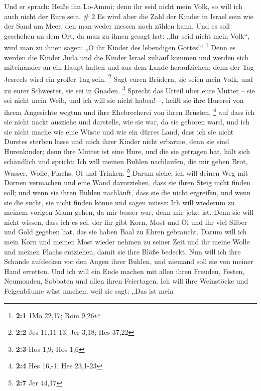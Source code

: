  Und er sprach: Heiße ihn Lo-Ammi; denn ihr seid nicht mein
Volk, so will ich auch nicht der Eure sein. \# 2  Es wird
aber die Zahl der Kinder in Israel sein wie der Sand am Meer, den man
weder messen noch zählen kann. Und es soll geschehen an dem Ort, da man
zu ihnen gesagt hat: „Ihr seid nicht mein Volk``, wird man zu ihnen
sagen: „O ihr Kinder des lebendigen Gottes!{}`` \footnote{\textbf{2:1}
  1Mo 22,17; Röm 9,26}  Denn es werden die Kinder Juda und
die Kinder Israel zuhauf kommen und werden sich miteinander an ein Haupt
halten und aus dem Lande heraufziehen; denn der Tag Jesreels wird ein
großer Tag sein. \footnote{\textbf{2:2} Jes 11,11-13; Jer 3,18; Hes
  37,22}  Sagt euren Brüdern, sie seien mein Volk, und zu
eurer Schwester, sie sei in Gnaden. \footnote{\textbf{2:3} Hos 1,9; Hos
  1,6}  Sprecht das Urteil über eure Mutter -- sie sei nicht
mein Weib, und ich will sie nicht haben! --, heißt sie ihre Hurerei von
ihrem Angesichte wegtun und ihre Ehebrecherei von ihren Brüsten,
\footnote{\textbf{2:4} Hes 16,-1; Hes 23,1-23}  auf dass ich
sie nicht nackt ausziehe und darstelle, wie sie war, da sie geboren
ward, und ich sie nicht mache wie eine Wüste und wie ein dürres Land,
dass ich sie nicht Durstes sterben lasse  und mich ihrer
Kinder nicht erbarme, denn sie sind Hurenkinder;  denn ihre
Mutter ist eine Hure, und die sie getragen hat, hält sich schändlich und
spricht: Ich will meinen Buhlen nachlaufen, die mir geben Brot, Wasser,
Wolle, Flachs, Öl und Trinken. \footnote{\textbf{2:7} Jer 44,17}
 Darum siehe, ich will deinen Weg mit Dornen vermachen und
eine Wand davorziehen, dass sie ihren Steig nicht finden soll;
 und wenn sie ihren Buhlen nachläuft, dass sie die nicht
ergreifen, und wenn sie die sucht, sie nicht finden könne und sagen
müsse: Ich will wiederum zu meinem vorigen Mann gehen, da mir besser
war, denn mir jetzt ist.  Denn sie will nicht wissen, dass
ich es sei, der ihr gibt Korn, Most und Öl und ihr viel Silber und Gold
gegeben hat, das sie haben Baal zu Ehren gebraucht.  Darum
will ich mein Korn und meinen Most wieder nehmen zu seiner Zeit und ihr
meine Wolle und meinen Flachs entziehen, damit sie ihre Blöße bedeckt.
 Nun will ich ihre Schande aufdecken vor den Augen ihrer
Buhlen, und niemand soll sie von meiner Hand erretten.  Und
ich will ein Ende machen mit allen ihren Freuden, Festen, Neumonden,
Sabbaten und allen ihren Feiertagen.  Ich will ihre
Weinstöcke und Feigenbäume wüst machen, weil sie sagt: „Das ist mein

